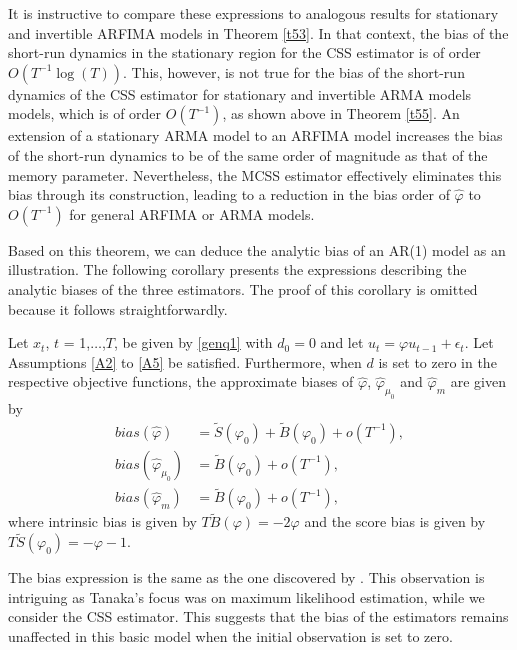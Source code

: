 {{It is instructive to compare these expressions to analogous results for stationary and invertible ARFIMA models in Theorem \ref{t53}. In that context, the bias of the short-run dynamics in the stationary region for the CSS
estimator is of order $O(T^{-1} \log(T))$. This, however, is not true for the bias of the short-run dynamics of the CSS estimator for stationary and invertible ARMA models models, which is of order $O(T^{-1})$, as shown above in
Theorem \ref{t55}.  An extension of a stationary ARMA model to an ARFIMA model increases the bias of the short-run dynamics to be of the same order of magnitude as that of the memory parameter. Nevertheless, the MCSS estimator
effectively eliminates this bias through its construction, leading to a reduction in the bias order of $\hat{\varphi}$ to $O(T^{-1})$ for general ARFIMA or ARMA models.


Based on this theorem, we can deduce the analytic bias of an AR(1) model as an illustration. The following corollary presents the expressions describing the analytic biases of the three estimators. The proof of this corollary is
omitted because it follows straightforwardly.


    
\begin{corollary}\label{t56} 
  Let $x_t$, $t$ = 1,$\ldots$,$T$, be given by \eqref{genq1} with $d_0 = 0$ and let $u_t = \varphi u_{t-1} + \epsilon_t$. Let Assumptions \ref{A2} to \ref{A5} be satisfied. Furthermore, when $d$ is set to zero in the respective
  objective functions, the approximate biases of $\hat{\varphi}$, $\hat{\varphi}_{\mu_0}$ and $\hat{\varphi}_{m}$ are given by
\begin{align}
    bias(\hat{\varphi}) &= \tilde{S}(\varphi_0) + \tilde{B}(\varphi_0) + o(T^{-1}), \\
    bias(\hat{\varphi}_{\mu_0}) &= \tilde{B}(\varphi_0)  + o(T^{-1}), \\
    bias(\hat{\varphi}_{m}) &=  \tilde{B}(\varphi_0)  + o(T^{-1}),
\end{align}
where intrinsic bias is given by $T \tilde{B}(\varphi) = -2\varphi$ and the score bias is given by  
$T\tilde{S}(\varphi_0) = -\varphi-1$.
\end{corollary}

The bias expression is the same as the one discovered by \textcite{tanaka1984asymptotic}. This observation is intriguing as Tanaka's focus was on maximum likelihood estimation, while we consider the CSS estimator. This suggests
that the bias of the estimators remains unaffected in this basic model when the initial observation is set to zero.







}}
